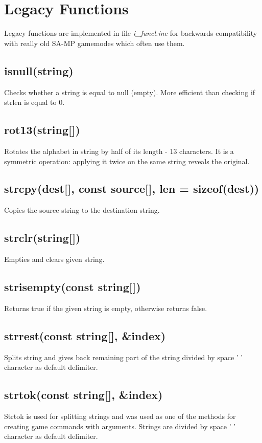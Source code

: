\documentclass{article}
\begin{document}
\newpage
\section{Legacy Functions}
Legacy functions are implemented in file \textit{i\_funcl.inc} for backwards compatibility with really old SA-MP gamemodes which often use them.

\subsection{isnull(string)}
Checks whether a string is equal to null (empty). More efficient than checking if strlen is equal to 0.

\subsection{rot13(string[])}
Rotates the alphabet in string by half of its length - 13 characters. It is a symmetric operation: applying it twice on the same string reveals the original.

\subsection{strcpy(dest[], const source[], len = sizeof(dest))}
Copies the source string to the destination string.

\subsection{strclr(string[])}
Empties and clears given string.

\subsection{strisempty(const string[])}
Returns true if the given string is empty, otherwise returns false.

\subsection{strrest(const string[], \&index)}
Splits string and gives back remaining part of the string divided by space ' ' character as default delimiter.

\subsection{strtok(const string[], \&index)}
Strtok is used for splitting strings and was used as one of the methods for creating game commands with arguments. Strings are divided by space ' ' character as default delimiter.
\end{document}
